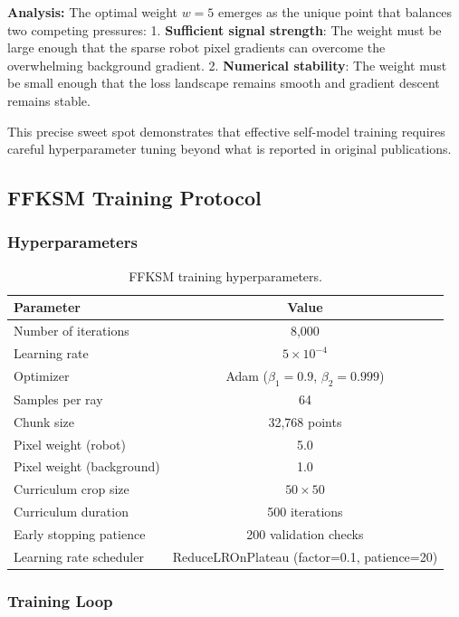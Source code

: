 \documentclass[12pt,a4paper,oneside]{report}
\begin{document}
\textbf{Analysis:} The optimal weight $w = 5$ emerges as the unique point that balances two competing pressures:
1. \textbf{Sufficient signal strength}: The weight must be large enough that the sparse robot pixel gradients can overcome the overwhelming background gradient.
2. \textbf{Numerical stability}: The weight must be small enough that the loss landscape remains smooth and gradient descent remains stable.

This precise sweet spot demonstrates that effective self-model training requires careful hyperparameter tuning beyond what is reported in original publications.

\subsection{FFKSM Training Protocol}

\subsubsection{Hyperparameters}

\begin{table}[H]
\centering
\caption{FFKSM training hyperparameters.}
\label{tab:ffksm_hyperparams}
\begin{tabular}{lc}
\toprule
Parameter & Value \\
\midrule
Number of iterations & 8,000 \\
Learning rate & $5 \times 10^{-4}$ \\
Optimizer & Adam ($\beta_1=0.9$, $\beta_2=0.999$) \\
Samples per ray & 64 \\
Chunk size & 32,768 points \\
Pixel weight (robot) & 5.0 \\
Pixel weight (background) & 1.0 \\
Curriculum crop size & $50 \times 50$ \\
Curriculum duration & 500 iterations \\
Early stopping patience & 200 validation checks \\
Learning rate scheduler & ReduceLROnPlateau (factor=0.1, patience=20) \\
\bottomrule
\end{tabular}
\end{table}

\subsubsection{Training Loop}
\end{document}
